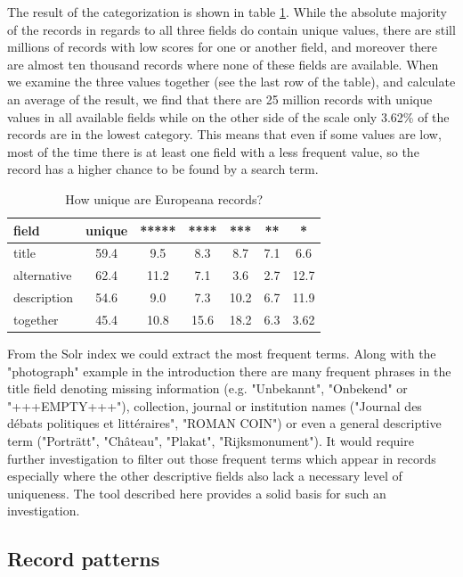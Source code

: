 The result of the categorization is shown in table \ref{table:uniqueness-result}. While the absolute majority of the records in regards to all three fields do contain unique values, there are still millions of records with low scores for one or another field, and moreover there are almost ten thousand records where none of these fields are available. When we examine the three values together (see the last row of the table), and calculate an average of the result, we find that there are 25 million records with unique values in all available fields while on the other side of the scale only 3.62\% of the records are in the lowest category. This means that even if some values are low, most of the time there is at least one field with a less frequent value, so the record has a higher chance to be found by a search term.

\begin{table}
\caption{How unique are Europeana records?}
\label{table:uniqueness-result}
\centering
\begin{tabular}{l|c|c|c|c|c|c}
field & unique & ***** & **** & *** & ** & * \\
\hline
title & 59.4 & 9.5 & 8.3 & 8.7 & 7.1 & 6.6 \\
alternative & 62.4 & 11.2 & 7.1 & 3.6 & 2.7 & 12.7 \\
description & 54.6 & 9.0 & 7.3 & 10.2 & 6.7 & 11.9 \\
together & 45.4 & 10.8 & 15.6 & 18.2 & 6.3 & 3.62
\end{tabular}
\end{table}

From the Solr index we could extract the most frequent terms. Along with the "photograph" example in the introduction there are many frequent phrases in the title field denoting missing information (e.g. "Unbekannt", "Onbekend" or "+++EMPTY+++"), collection, journal or institution names ("Journal des débats politiques et littéraires", "ROMAN COIN") or even a general descriptive term ("Porträtt", "Château", "Plakat", "Rijksmonument"). It would require further investigation to filter out those frequent terms which appear in records especially where the other descriptive fields also lack a necessary level of uniqueness. The tool described here provides a solid basis for such an investigation.

\subsection{Record patterns}

